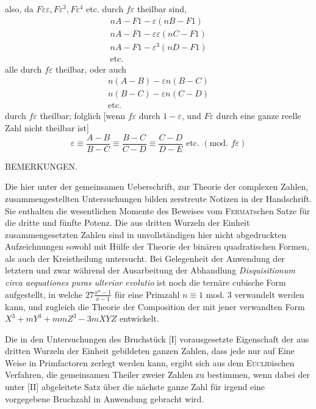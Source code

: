 also, da $F\varepsilon\varepsilon,F\varepsilon^3,F\varepsilon^4$ etc. durch $f\varepsilon$ theilbar sind,
\[
\begin{gathered}
nA-F1-\varepsilon(nB-F1)\\
nA-F1-\varepsilon\varepsilon(nC-F1)\\
nA-F1-\varepsilon^3(nD-F1)\\
\text{etc.}
\end{gathered}
\]
alle durch $f\varepsilon$ theilbar, oder auch
\[
\begin{gathered}
n(A-B)-\varepsilon n(B-C)\\
n(B-C)-\varepsilon n(C-D)\\
\text{etc.}
\end{gathered}
\]
durch $f\varepsilon$ theilbar; folglich [wenn $f\varepsilon$ durch $1-\varepsilon$, und $F\varepsilon$ durch eine ganze reelle Zahl nicht theilbar ist]
\[
\varepsilon\equiv\frac{A-B}{B-C}\equiv\frac{B-C}{C-D}\equiv\frac{C-D}{D-E}\text{ etc. }(\text{mod. }f\varepsilon)
\]

%
\begin{center}BEMERKUNGEN.\end{center}
Die hier unter der gemeinsamen Ueberschrift, zur Theorie der complexen Zahlen, zusammengestellten Untersuchungen bilden zerstreute Notizen in der Handschrift. Sie enthalten die wesentlichen Momente des Beweises vom \textsc{Fermat}schen Satze für die dritte und fünfte Potenz. Die aus dritten Wurzeln der Einheit zusammengesetzten Zahlen sind in unvollständigen hier nicht abgedruckten Aufzeichnungen sowohl mit Hülfe der Theorie der binären quadratischen Formen, als auch der Kreistheilung untersucht. Bei Gelegenheit der Anwendung der letztern und zwar während der Ausarbeitung der Abhandlung \emph{Disquisitionum circa aequationes puras ulterior evolutio} ist noch die ternäre cubische Form aufgestellt, in welche $27\frac{x^n-1}{x-1}$ für eine Primzahl $n\equiv1\text{ mod. }3$ verwandelt werden kann, und zugleich die Theorie der Composition der mit jener verwandten Form $X^3+mY^3+mmZ^3-3mXYZ$ entwickelt.

Die in den Untersuchungen des Bruchstück [I] vorausgesetzte Eigenschaft der aus dritten Wurzeln der Einheit gebildeten ganzen Zahlen, dass jede nur auf Eine Weise in Primfactoren zerlegt werden kann, ergibt sich aus dem \textsc{Euclid}ischen Verfahren, die gemeinsamen Theiler zweier Zahlen zu bestimmen, wenn dabei der unter [II] abgeleitete Satz über die nächste ganze Zahl für irgend eine vorgegebene Bruchzahl in Anwendung gebracht wird.

